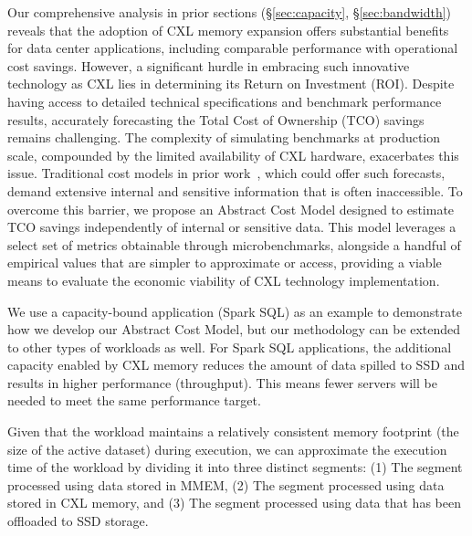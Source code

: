 Our comprehensive analysis in prior sections (\S\ref{sec:capacity}, \S\ref{sec:bandwidth}) reveals that the adoption of CXL memory expansion offers substantial benefits for data center applications, including comparable performance with operational cost savings. However, a significant hurdle in embracing such innovative technology as CXL lies in determining its Return on Investment (ROI). Despite having access to detailed technical specifications and benchmark performance results, accurately forecasting the Total Cost of Ownership (TCO) savings remains challenging. The complexity of simulating benchmarks at production scale, compounded by the limited availability of CXL hardware, exacerbates this issue. Traditional cost models in prior work~\cite{CXLPoolCost}, which could offer such forecasts, demand extensive internal and sensitive information that is often inaccessible. To overcome this barrier, we propose an Abstract Cost Model designed to estimate TCO savings independently of internal or sensitive data. This model leverages a select set of metrics obtainable through microbenchmarks, alongside a handful of empirical values that are simpler to approximate or access, providing a viable means to evaluate the economic viability of CXL technology implementation.

We use a capacity-bound application (Spark SQL) as an example to demonstrate how we develop our Abstract Cost Model, but our methodology can be extended to other types of workloads as well. For Spark SQL applications, the additional capacity enabled by CXL memory reduces the amount of data spilled to SSD and results in higher performance (throughput).
This means fewer servers will be needed to meet the same performance target.

Given that the workload maintains a relatively consistent memory footprint (the size of the active dataset) during execution, we can approximate the execution time of the workload by dividing it into three distinct segments: (1) The segment processed using data stored in MMEM, (2) The segment processed using data stored in CXL memory, and (3) The segment processed using data that has been offloaded to SSD storage.



